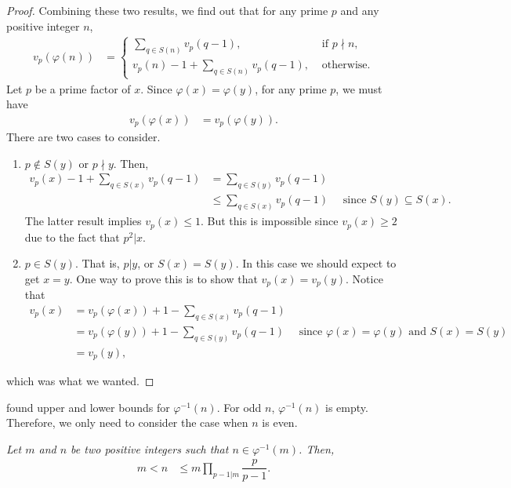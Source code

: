 \documentclass{subfile}
\begin{document}
\begin{proof}
			Combining these two results, we find out that for any prime $p$ and any positive integer $n$,
				\begin{align*}
					v_p(\varphi(n)) & = 
						\begin{cases}
							\displaystyle\sum_{q\in S(n)}v_p(q-1),&\text{ if }p\nmid n,\\
							v_p(n)-1+\displaystyle \sum_{q\in S(n)}v_p(q-1),&\text{ otherwise}.
						\end{cases}
				\end{align*}
			Let $p$ be a prime factor of $x$. Since $\varphi(x)=\varphi(y)$, for any prime $p$, we must have
				\begin{align*}
					v_p(\varphi(x)) & = v_p(\varphi(y)).
				\end{align*}
			There are two cases to consider.
				\begin{enumerate}[1.]
					\item $p\notin S(y)$ or $p\nmid y$. Then,
							\begin{align*}
								v_p(x)-1+\sum_{q\in S(x)}v_p(q-1) & = \sum_{q\in S(y)}v_p(q-1)\\
																	  & \leq\sum_{q\in S(x)}v_p(q-1) \quad \text{ since }S(y)\subseteq S(x).
							\end{align*}
						The latter result implies $v_p(x) \leq 1.$ But this is impossible since $v_p(x)\geq2$ due to the fact that $p^2|x$.
					\item $p\in S(y)$. That is, $p|y$, or $S(x)=S(y)$. In this case we should expect to get $x=y$. One way to prove this is to show that $v_p(x)=v_p(y)$. Notice that
						\begin{align*}
							v_p(x) & = v_p(\varphi(x))+1-\sum_{q\in S(x)} v_p(q-1)\\
									 & = v_p(\varphi(y))+1-\sum_{q\in S(y)} v_p(q-1)\quad \text{ since }\varphi(x)=\varphi(y)\text{ and }S(x)=S(y)\\
									 & = v_p(y),
						\end{align*}
				\end{enumerate}
			which was what we wanted.
		\end{proof}
	
	\textcite{gupta_1981} found upper and lower bounds for $\varphi^{-1}(n)$. For odd $n$, $\varphi^{-1}(n)$ is empty. Therefore, we only need to consider the case when $n$ is even. 
		\begin{theorem}[Gupta]\slshape\label{thm:gupta}
			Let $m$ and $n$ be two positive integers such that $n\in\varphi^{-1}(m)$. Then,
				\begin{align*}
					m < n & \leq m\prod_{p-1|m}\dfrac{p}{p-1}.
				\end{align*}
		\end{theorem}
		
\end{document}
